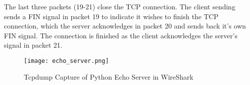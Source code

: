 The last three packets (19-21) close the TCP connection. The client sending sends a FIN signal in packet 19 to indicate it wishes to finish the TCP connection, which the server acknowledges in packet 20 and sends back it's own FIN signal. The connection is finished as the client acknowledges the server's signal in packet 21.

\begin{figure}[htp]
\centering
\caption[echo_wireshark]{Tcpdump Capture of Python Echo Server in WireShark}\label{fig:echo_wireshark}
\texttt{[image: echo\_server.png]}
\end{figure}
